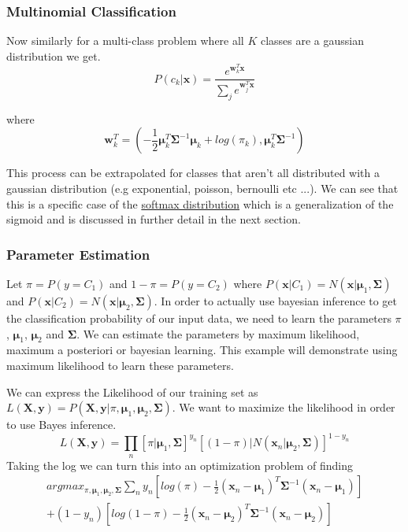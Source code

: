 \documentclass[12pt]{article}
\begin{document}
        \subsubsection{Multinomial Classification}
        Now similarly for a multi-class problem where all $K$ classes are a gaussian distribution we get.
        $$ P(c_k | \boldsymbol{x}) = \frac{e^{\boldsymbol{w}^T_k\boldsymbol{x}}}{\sum_j e^{\boldsymbol{w}^T_j\boldsymbol{x}}} $$

        where
        $$ \boldsymbol{w}^T_k = (-\frac{1}{2}\boldsymbol{\mu}^T_k \boldsymbol{\Sigma}^{-1} \boldsymbol{\mu}_k + log(\pi_k), \boldsymbol{\mu}_k^T\boldsymbol{\Sigma}^{-1}) $$

        This process can be extrapolated for classes that aren't all distributed with a gaussian distribution (e.g exponential, poisson, bernoulli etc ...). We can see that this is a specific case of the \hyperlink{Softmax Regression}{softmax distribution} which is a generalization of the sigmoid 
        and is discussed in further detail in the next section.

        \subsubsection{Parameter Estimation}
            Let $\pi = P(y = C_1)$ and $1 - \pi=P(y = C_2)$ where $P(\boldsymbol{x}|C_1)=N(\boldsymbol{x}|\boldsymbol{\mu}_1, \boldsymbol{\Sigma})$ and $P(\boldsymbol{x}|C_2) = N(\boldsymbol{x}|\boldsymbol{\mu}_2, \boldsymbol{\Sigma})$. In order to actually use bayesian inference to get the classification probability of our input data, we need to learn the parameters $\pi$, $\boldsymbol{\mu}_1$, $\boldsymbol{\mu}_2$ and $\boldsymbol{\Sigma}$. 
            We can estimate the parameters by maximum likelihood, maximum a posteriori or bayesian learning. This example will demonstrate using maximum likelihood to learn these parameters.

            We can express the Likelihood of our training set as $L(\boldsymbol{X},\boldsymbol{y}) = P(\boldsymbol{X},\boldsymbol{y}|\pi,\boldsymbol{\mu}_1,\boldsymbol{\mu}_2,\boldsymbol{\Sigma})$. We want to maximize the likelihood in order to use Bayes inference.
            $$ L(\boldsymbol{X},\boldsymbol{y}) = \prod_{n}{[\pi|\boldsymbol{\mu}_1, \boldsymbol{\Sigma}]^{y_n}[(1-\pi)|N(\boldsymbol{x}_n|\boldsymbol{\mu}_2,\boldsymbol{\Sigma})]^{1-y_n}} $$
            Taking the log we can turn this into an optimization problem of finding
            \begin{multline*}
                argmax_{\pi, \boldsymbol{\mu}_1, \boldsymbol{\mu}_2, \boldsymbol{\Sigma}} \sum _{n}y_n[log(\pi) - \frac{1}{2}(\boldsymbol{x}_n - \boldsymbol{\mu}_1)^T \boldsymbol{\Sigma}^{-1}(\boldsymbol{x}_n-\boldsymbol{\mu}_1)]\\ 
                + (1-y_n)[log(1 - \pi) - \frac{1}{2}(\boldsymbol{x}_n - \boldsymbol{\mu}_2)^T \boldsymbol{\Sigma}^{-1}(\boldsymbol{x}_n-\boldsymbol{\mu}_2)]
            \end{multline*}
\end{document}
